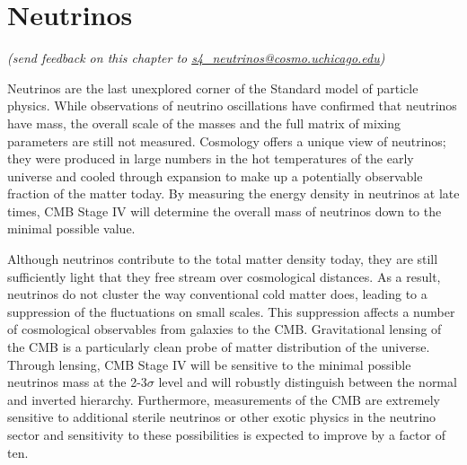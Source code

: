  
\chapter{Neutrinos}


\def\beq{\begin{equation}}
\def\eeq{\end{equation}}

\def\bea{\begin{eqnarray}}
\def\eea{\end{eqnarray}}

\def\Neff{N_{\rm eff}}
\def\Nf{N_{\rm eff}}
\def\gs{g_{\star}}
\def\Mpl{M_{\rm pl}}
\newcommand{\nucl}[3]{ \ensuremath{ \phantom{\ensuremath{^{#1}_{#2}}} \llap{\ensuremath{^{#1}}} \llap{\ensuremath{_{\rule{0pt}{.75em}#2}}} \mbox{#3} } }


\def\gtrsim{\raise-.75ex\hbox{$\buildrel>\over\sim$}}
\def\lsim{\raise-.75ex\hbox{$\buildrel<\over\sim$}}

\begin{center}
{\small \it (send feedback on this chapter to \href{mailto:s4_neutrinos@cosmo.uchicago.edu}{s4\_neutrinos@cosmo.uchicago.edu})}
\end{center}


Neutrinos are the last unexplored corner of the Standard model of particle physics.  While observations of neutrino oscillations have confirmed that neutrinos have mass, the overall scale of the masses and the full matrix of mixing parameters are still not measured.  Cosmology offers a unique view of neutrinos; they were produced in large numbers in the hot temperatures of the early universe and cooled through expansion to make up a potentially observable fraction of the matter today.  By measuring the energy density in neutrinos at late times, CMB Stage IV will determine the overall mass of neutrinos down to the minimal possible value.  

Although neutrinos contribute to the total matter density today, they are still sufficiently light that they free stream over cosmological distances.  As a result, neutrinos do not cluster the way conventional cold matter does, leading to a suppression of the fluctuations on small scales.  This suppression affects a number of cosmological observables from galaxies to the CMB. Gravitational lensing of the CMB is a particularly clean probe of matter distribution of the universe.  Through lensing, CMB Stage IV will be sensitive to the minimal possible neutrinos mass at the 2-3$\sigma$ level and will robustly distinguish between the normal and inverted hierarchy.  Furthermore, measurements of the CMB are extremely sensitive to additional sterile neutrinos or other exotic physics in the neutrino sector and sensitivity to these possibilities is expected to improve by a factor of ten.

